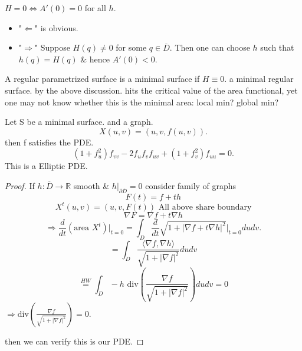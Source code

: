 \documentclass{article}
\begin{document}
\begin{proposition}
$H=0 \Leftrightarrow A'(0)=0$ for all $h$.
\begin{itemize}
    \item "$\Leftarrow$" is obvious.
    \item "$\Rightarrow$" Suppose $H(q) \ne 0$ for some $q \in \overline{D}$. Then one can choose $h$ such that $h(q) = H(q)$ \& hence $A'(0) < 0$.
\end{itemize}
\end{proposition}

\begin{definition}
A regular parametrized surface is a minimal surface if $H \equiv 0$.
a minimal regular surface.
by the above discussion. hits the critical value of the area functional, yet one may not know whether this is the minimal area: local min? global min?
\end{definition}

\begin{proposition}
Let S be a minimal surface. and a graph.
\[ X(u,v) = (u,v, f(u,v)). \]
then f satisfies the PDE.
\[ (1 + f_u^2) f_{vv} - 2 f_u f_v f_{uv} + (1 + f_v^2) f_{uu} = 0. \]
This is a Elliptic PDE.
\end{proposition}

\begin{proof}
If $h: \overline{D} \to \mathbb{R}$ smooth \& $h|_{\partial \overline{D}} = 0$ consider family of graphs
\[ F(t) = f + th \]
\[ X^t(u,v) = (u,v, F(t)) \text{ All above share boundary} \]
\[ \nabla F = \nabla f + t \nabla h \]
\[ \Rightarrow \frac{d}{dt} (\text{area } X^t) \Big|_{t=0} = \int_D \frac{d}{dt} \sqrt{1 + |\nabla f + t \nabla h|^2} \Big|_{t=0} du dv. \]
\[ = \int_D \frac{\langle \nabla f, \nabla h \rangle}{\sqrt{1 + |\nabla f|^2}} du dv \]
\[ \stackrel{HW}{=} \int_D -h \text{ div} \left(\frac{\nabla f}{\sqrt{1 + |\nabla f|^2}}\right) du dv = 0 \]
$\Rightarrow \text{div} \left(\frac{\nabla f}{\sqrt{1 + |\nabla f|^2}}\right) = 0$.

then we can verify this is our PDE.
\end{proof}
\end{document}
